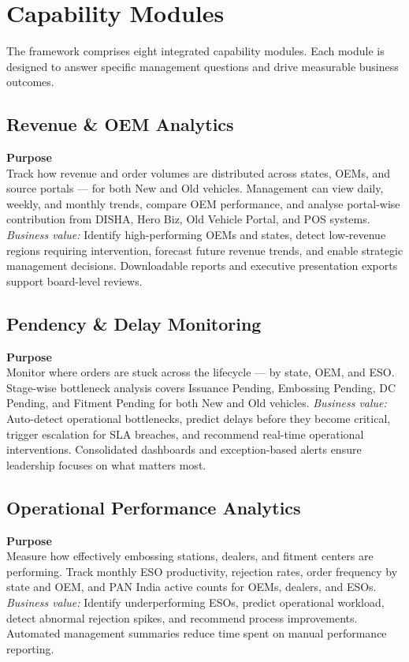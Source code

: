 \documentclass[11pt,a4paper]{article}
\newcommand{\capblock}[3]{%
    \vspace{0.25em}
    \noindent\textbf{#1}\\[0.15em]
    #2
    \vspace{0.2em}
    \noindent\textit{Business value:} #3
    \vspace{0.35em}
}
\begin{document}
\section{Capability Modules}

The framework comprises eight integrated capability modules. Each module is designed to answer specific management questions and drive measurable business outcomes.

\subsection{Revenue \& OEM Analytics}

\capblock{Purpose}{%
Track how revenue and order volumes are distributed across states, OEMs, and source portals --- for both New and Old vehicles. Management can view daily, weekly, and monthly trends, compare OEM performance, and analyse portal-wise contribution from DISHA, Hero Biz, Old Vehicle Portal, and POS systems.}{%
Identify high-performing OEMs and states, detect low-revenue regions requiring intervention, forecast future revenue trends, and enable strategic management decisions. Downloadable reports and executive presentation exports support board-level reviews.}

\subsection{Pendency \& Delay Monitoring}

\capblock{Purpose}{%
Monitor where orders are stuck across the lifecycle --- by state, OEM, and ESO. Stage-wise bottleneck analysis covers Issuance Pending, Embossing Pending, DC Pending, and Fitment Pending for both New and Old vehicles.}{%
Auto-detect operational bottlenecks, predict delays before they become critical, trigger escalation for SLA breaches, and recommend real-time operational interventions. Consolidated dashboards and exception-based alerts ensure leadership focuses on what matters most.}

\subsection{Operational Performance Analytics}

\capblock{Purpose}{%
Measure how effectively embossing stations, dealers, and fitment centers are performing. Track monthly ESO productivity, rejection rates, order frequency by state and OEM, and PAN India active counts for OEMs, dealers, and ESOs.}{%
Identify underperforming ESOs, predict operational workload, detect abnormal rejection spikes, and recommend process improvements. Automated management summaries reduce time spent on manual performance reporting.}
\end{document}

